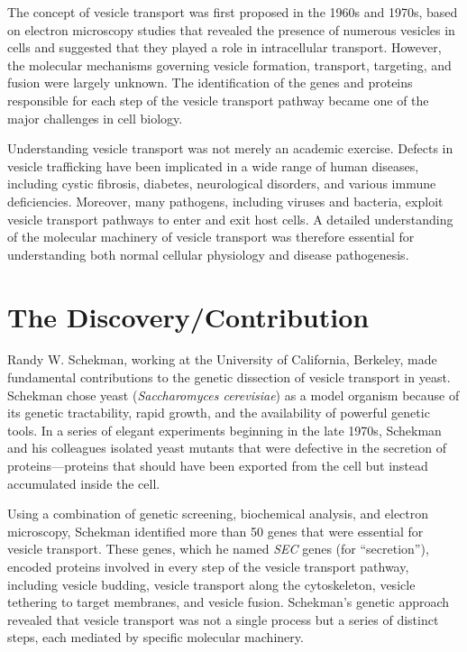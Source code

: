 The concept of vesicle transport was first proposed in the 1960s and 1970s, based on electron microscopy studies that revealed the presence of numerous vesicles in cells and suggested that they played a role in intracellular transport. However, the molecular mechanisms governing vesicle formation, transport, targeting, and fusion were largely unknown. The identification of the genes and proteins responsible for each step of the vesicle transport pathway became one of the major challenges in cell biology.

Understanding vesicle transport was not merely an academic exercise. Defects in vesicle trafficking have been implicated in a wide range of human diseases, including cystic fibrosis, diabetes, neurological disorders, and various immune deficiencies. Moreover, many pathogens, including viruses and bacteria, exploit vesicle transport pathways to enter and exit host cells. A detailed understanding of the molecular machinery of vesicle transport was therefore essential for understanding both normal cellular physiology and disease pathogenesis.

\section{The Discovery/Contribution}

Randy W. Schekman, working at the University of California, Berkeley, made fundamental contributions to the genetic dissection of vesicle transport in yeast. Schekman chose yeast (\textit{Saccharomyces cerevisiae}) as a model organism because of its genetic tractability, rapid growth, and the availability of powerful genetic tools. In a series of elegant experiments beginning in the late 1970s, Schekman and his colleagues isolated yeast mutants that were defective in the secretion of proteins---proteins that should have been exported from the cell but instead accumulated inside the cell.

Using a combination of genetic screening, biochemical analysis, and electron microscopy, Schekman identified more than 50 genes that were essential for vesicle transport. These genes, which he named \textit{SEC} genes (for ``secretion''), encoded proteins involved in every step of the vesicle transport pathway, including vesicle budding, vesicle transport along the cytoskeleton, vesicle tethering to target membranes, and vesicle fusion. Schekman's genetic approach revealed that vesicle transport was not a single process but a series of distinct steps, each mediated by specific molecular machinery.

